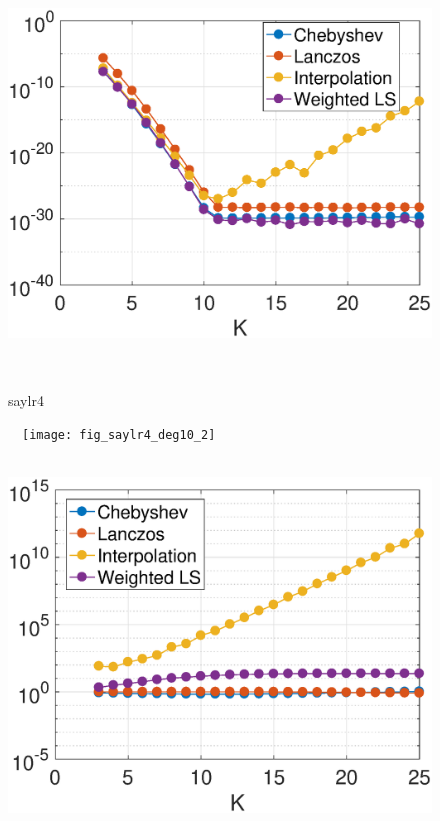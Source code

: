 \documentclass{article}
\begin{document}
\begin{figure}[bth]
\begin{minipage}[m]{0.44\linewidth}
\centerline{~~\includegraphics[width=.95\linewidth]{fig_cage9_err_const_b2}}
\end{minipage}\\
\begin{minipage}[m]{0.1\linewidth}
\centerline{\small{saylr4}}
\end{minipage}
\begin{minipage}[m]{0.44\linewidth}
\centerline{~~\texttt{[image: fig\_saylr4\_deg10\_2]}}
\end{minipage}
\begin{minipage}[m]{0.44\linewidth}
\centerline{~~\includegraphics[width=.95\linewidth]{fig_saylr4_err_const_b2}}
\end{minipage}\\

\end{figure}
\end{document}
